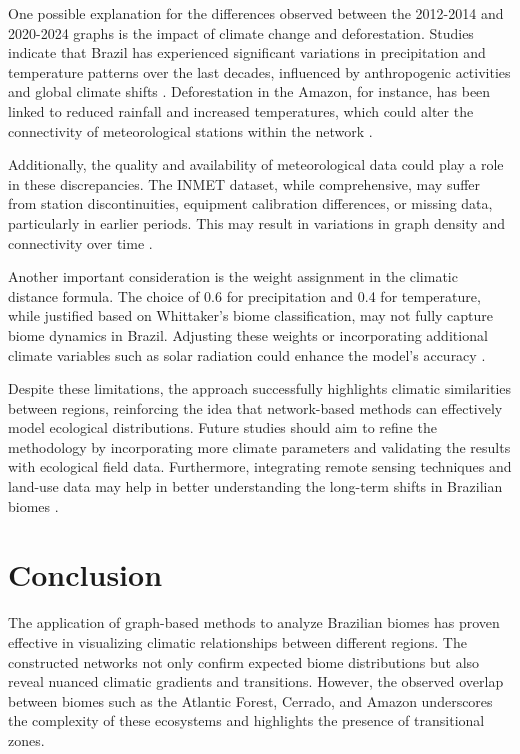 \documentclass[conference]{IEEEtran}
\begin{document}
One possible explanation for the differences observed between the 2012-2014 and 2020-2024 graphs is the impact of climate change and deforestation. Studies indicate that Brazil has experienced significant variations in precipitation and temperature patterns over the last decades, influenced by anthropogenic activities and global climate shifts \cite{marengo2020extreme}. Deforestation in the Amazon, for instance, has been linked to reduced rainfall and increased temperatures, which could alter the connectivity of meteorological stations within the network \cite{nobre2016land}.

Additionally, the quality and availability of meteorological data could play a role in these discrepancies. The INMET dataset, while comprehensive, may suffer from station discontinuities, equipment calibration differences, or missing data, particularly in earlier periods. This may result in variations in graph density and connectivity over time \cite{sapucci2019quality}.

Another important consideration is the weight assignment in the climatic distance formula. The choice of 0.6 for precipitation and 0.4 for temperature, while justified based on Whittaker’s biome classification, may not fully capture biome dynamics in Brazil. Adjusting these weights or incorporating additional climate variables such as solar radiation could enhance the model's accuracy \cite{whittaker1975communities}.

Despite these limitations, the approach successfully highlights climatic similarities between regions, reinforcing the idea that network-based methods can effectively model ecological distributions. Future studies should aim to refine the methodology by incorporating more climate parameters and validating the results with ecological field data. Furthermore, integrating remote sensing techniques and land-use data may help in better understanding the long-term shifts in Brazilian biomes \cite{deoliveira2021remote}.

\section{Conclusion}

The application of graph-based methods to analyze Brazilian biomes has proven effective in visualizing climatic relationships between different regions. The constructed networks not only confirm expected biome distributions but also reveal nuanced climatic gradients and transitions. However, the observed overlap between biomes such as the Atlantic Forest, Cerrado, and Amazon underscores the complexity of these ecosystems and highlights the presence of transitional zones.
\end{document}
